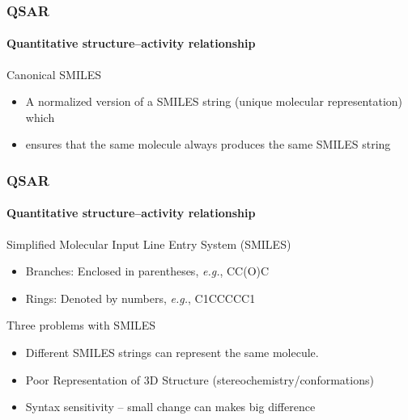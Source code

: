 \documentclass[aspectratio=169,dvipsnames]{beamer}
\begin{document}
    \begin{frame}
        \frametitle{QSAR}
        \framesubtitle{Quantitative structure–activity relationship}
        \vspace{-30pt}
        \begin{block}{Canonical SMILES}
            \begin{itemize}
                \item A normalized version of a SMILES string (unique molecular representation) which
                \item ensures that the same molecule always produces the same SMILES string
            \end{itemize}
        \end{block}
    \end{frame}

    \begin{frame}
        \frametitle{QSAR}
        \framesubtitle{Quantitative structure–activity relationship}
        \vspace{-30pt}
        \begin{block}{Simplified Molecular Input Line Entry System (SMILES)}
        \begin{itemize}
            \item Branches: Enclosed in parentheses, \textit{e.g.}, CC(O)C
            \item Rings: Denoted by numbers, \textit{e.g.}, C1CCCCC1
        \end{itemize}
        \end{block}

        \begin{block}{Three problems with SMILES}
        \begin{itemize}
            \item Different SMILES strings can represent the same molecule.
            \item Poor Representation of 3D Structure (stereochemistry/conformations)
            \item Syntax sensitivity -- small change can makes big difference
        \end{itemize}
        \end{block}
    \end{frame}
\end{document}
